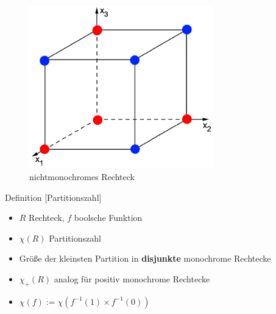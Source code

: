 \begin{frame}
    \begin{figure}
        \centering
        \includegraphics[width=80mm,scale=0.5]{monochrom3.png}
        \caption{nichtmonochromes Rechteck}
    \end{figure}
\end{frame}

\begin{frame}
    \begin{block}{Definition [Partitionszahl]}
        \begin{itemize}
            \item $R$ Rechteck, $f$ boolsche Funktion
            \item $\chi(R)$ Partitionszahl
            \item Größe der kleinsten Partition in \textbf{disjunkte} monochrome Rechtecke
            \item $\chi_+(R)$ analog für positiv monochrome Rechtecke
            \item $\chi (f) := \chi (f^{-1}(1) \times f^{-1}(0))$
        \end{itemize}
        
    \end{block}
\end{frame}

%    

